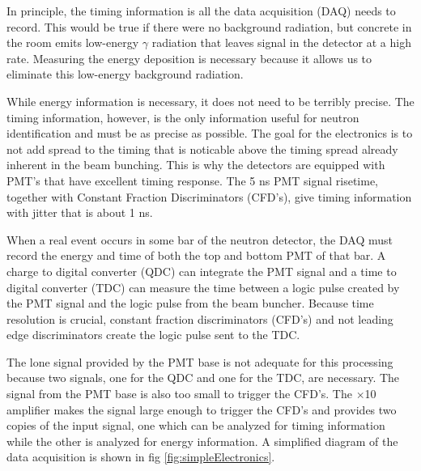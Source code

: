 In principle, the timing information is all the data acquisition (DAQ) needs to record.  This would be true if there were no background radiation, but concrete in the room emits low-energy $\gamma$ radiation that leaves signal in the detector at a high rate.  Measuring the energy deposition is necessary because it allows us to eliminate this low-energy background radiation.

While energy information is necessary, it does not need to be terribly precise.  The timing information, however, is the only information useful for neutron identification and must be as precise as possible.  The goal for the electronics is to not add spread to the timing that is noticable above the timing spread already inherent in the beam bunching.  This is why the detectors are equipped with PMT's that have excellent timing response.  The 5 ns PMT signal risetime, together with Constant Fraction Discriminators (CFD's), give timing information with jitter that is about 1 ns.


When a real event occurs in some bar of the neutron detector, the DAQ must record the energy and time of both the top and bottom PMT of that bar.  A charge to digital converter (QDC) can integrate the PMT signal and a time to digital converter (TDC) can measure the time between a logic pulse created by the PMT signal and the logic pulse from the beam buncher.  Because time resolution is crucial, constant fraction discriminators (CFD's) and not leading edge discriminators create the logic pulse sent to the TDC.  

The lone signal provided by the PMT base is not adequate for this processing because two signals, one for the QDC and one for the TDC, are necessary.  The signal from the PMT base is also too small to trigger the CFD's.  The $\times$10 amplifier makes the signal large enough to trigger the CFD's and provides two copies of the input signal, one which can be analyzed for timing information while the other is analyzed for energy information.  A simplified diagram of the data acquisition is shown in fig \ref{fig:simpleElectronics}.

